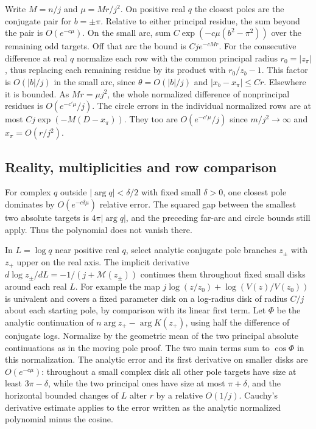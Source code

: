 \documentclass[11pt]{article}
\begin{document}
Write \(M=n/j\) and \(\mu=Mr/j^2\). On positive real \(q\) the closest poles are the conjugate pair for \(b=\pm\pi\). Relative to either principal residue, the sum beyond the pair is \(O(e^{-c\mu})\). On the small arc, sum \(C\exp(-c\mu(b^2-\pi^2))\) over the remaining odd targets. Off that arc the bound is \(Cj e^{-cMr}\). For the consecutive difference at real \(q\) normalize each row with the common principal radius \(r_0=|z_\pi|\), thus replacing each remaining residue by its product with \(r_0/z_b-1\). This factor is \(O(|b|/j)\) in the small arc, since \(\theta=O(|b|/j)\) and \(|x_b-x_\pi|\le Cr\). Elsewhere it is bounded. As \(Mr=\mu j^2\), the whole normalized difference of nonprincipal residues is \(O(e^{-c'\mu}/j)\). The circle errors in the individual normalized rows are at most \(Cj\exp(-M(D-x_\pi))\). They too are \(O(e^{-c'\mu}/j)\) since \(m/j^2\to\infty\) and \(x_\pi=O(r/j^2)\).

\subsection{Reality, multiplicities and row comparison}
\label{sec:reality-multiplicities-and-row-comparison}

For complex \(q\) outside \(|\arg q|<\delta/2\) with fixed small \(\delta>0\), one closest pole dominates by \(O(e^{-c\delta\mu})\) relative error. The squared gap between the smallest two absolute targets is \(4\pi|\arg q|\), and the preceding far-arc and circle bounds still apply. Thus the polynomial does not vanish there.

In \(L=\log q\) near positive real \(q\), select analytic conjugate pole branches \(z_\pm\) with \(z_+\) upper on the real axis. The implicit derivative \(d\log z_\pm/dL=-1/(j+\mathcal M(z_\pm))\) continues them throughout fixed small disks around each real \(L\). For example the map \(j\log(z/z_0)+\log(V(z)/V(z_0))\) is univalent and covers a fixed parameter disk on a log-radius disk of radius \(C/j\) about each starting pole, by comparison with its linear first term. Let \(\Phi\) be the analytic continuation of \(n\arg z_+-\arg K(z_+)\), using half the difference of conjugate logs. Normalize by the geometric mean of the two principal absolute continuations as in the moving pole proof. The two main terms sum to \(\cos\Phi\) in this normalization. The analytic error and its first derivative on smaller disks are \(O(e^{-c\mu})\): throughout a small complex disk all other pole targets have size at least \(3\pi-\delta\), while the two principal ones have size at most \(\pi+\delta\), and the horizontal bounded changes of \(L\) alter \(r\) by a relative \(O(1/j)\). Cauchy's derivative estimate applies to the error written as the analytic normalized polynomial minus the cosine.
\end{document}
